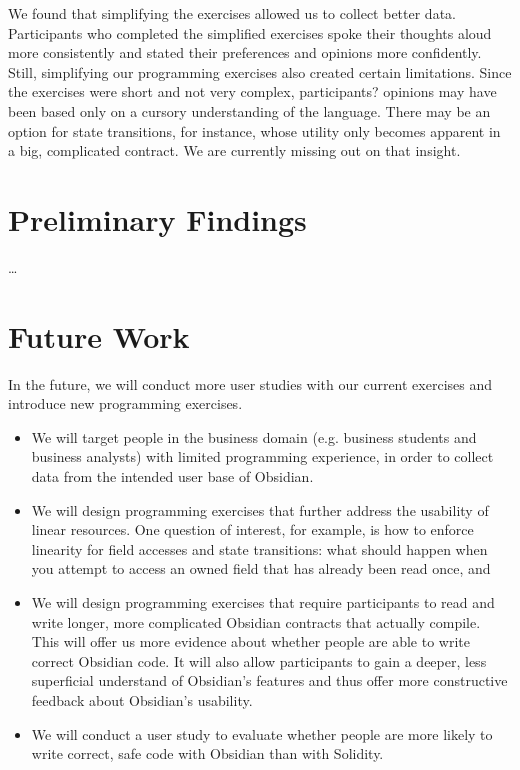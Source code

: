 \documentclass[sigplan,10pt,review,anonymous]{acmart}\settopmatter{printfolios=true}
\begin{document}
We found that simplifying the exercises allowed us to collect better data. Participants who completed the simplified exercises spoke their thoughts aloud more consistently and stated their preferences and opinions more confidently. 
Still, simplifying our programming exercises also created certain limitations. Since the exercises were short and not very complex, participants? opinions may have been based only on a cursory understanding of the language. There may be an option for state transitions, for instance, whose utility only becomes apparent in a big, complicated contract. We are currently missing out on that insight. 


\section{Preliminary Findings}
\ldots

\section{Future Work}

In the future, we will conduct more user studies with our current exercises and introduce new programming
exercises.
\begin{itemize}
\item We will target people in the business domain (e.g. business students and business analysts) with limited
programming experience, in order to collect data from the intended user base of Obsidian.
\item We will design programming exercises that further address the usability of linear resources. One question
of interest, for example, is how to enforce linearity for field accesses and state transitions: what should happen
when you attempt to access an owned field that has already been read once, and  
\item We will design programming exercises that require participants to read and write longer, more complicated 
Obsidian contracts that actually compile. This will offer us more evidence about whether people are able to write 
correct Obsidian code. It will also allow participants to gain a deeper, less superficial understand of Obsidian's 
features and thus offer more constructive feedback about Obsidian's usability. 
\item We will conduct a user study to evaluate whether people are more likely to write correct, safe code with 
Obsidian than with Solidity. 
\end{itemize}
\end{document}
